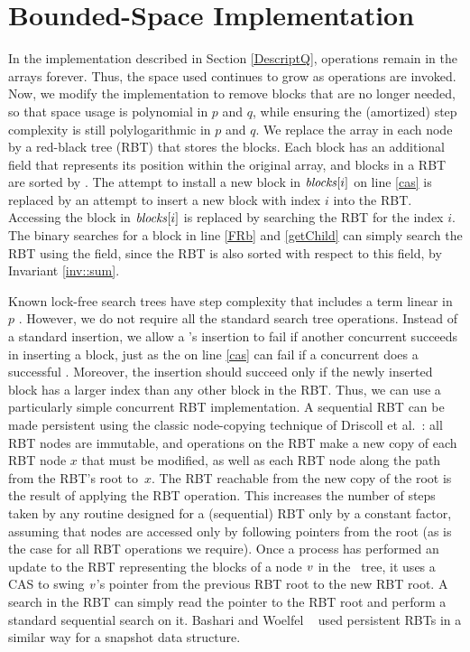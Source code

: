 
\section{Bounded-Space Implementation}
\label{reducing}

In the implementation described in Section \ref{DescriptQ}, 
operations remain in the  arrays forever. 
Thus, the space used continues to grow as operations are invoked.
Now, we modify the implementation to remove blocks that are no longer needed, so that space usage is
polynomial in $p$ and $q$, while ensuring the (amortized) step complexity is still polylogarithmic 
in $p$ and $q$. We replace the  array in each node by a red-black tree (RBT)
that stores the blocks.
Each block has an additional  field
that represents its position within the original  array, and
blocks in a RBT are sorted by .
The attempt to install a new block in $\mbox{\textit{blocks}}[i]$  on line \ref{cas}
is replaced by an attempt to insert a new block with index $i$ into the RBT.
Accessing the block in $\mbox{\textit{blocks}}[i]$ is 
replaced by searching the RBT for the  index $i$.
The binary searches for a block in line \ref{FRb} and \ref{getChild} can simply search the RBT
using the  field, since the RBT is also sorted with respect to this field, by Invariant \ref{inv::sum}.
 
Known lock-free search trees have step complexity that includes a term linear in $p$ \cite{EFHR14,Ko20}.  
However, we do not require all the standard search tree operations.
Instead of a standard insertion, we allow a 's insertion to fail if another
concurrent  succeeds in inserting a block, just as the  on line \ref{cas}
can fail if a concurrent  does a successful .
Moreover, the insertion should succeed only if the newly inserted block has a larger index than any other block in the RBT.
Thus, we can use a particularly simple concurrent RBT implementation.
A sequential RBT can be made persistent using the classic node-copying technique of 
Driscoll et al.~\cite{DSST89}:  all RBT nodes are immutable, and operations on the 
RBT make a new copy of each RBT node $x$ that must be modified, as well
as each RBT node along the path from the RBT's root to~$x$.
The RBT reachable from the new copy of the root is the result of applying the RBT operation.
This increases the number of steps taken by any routine designed for a (sequential) RBT only by a constant factor, assuming that nodes are accessed only by following pointers from the root (as is the case for all RBT operations we require).
Once a process has performed an update to the RBT representing the blocks of a node 
$\mbox{\textnormal{\textit{v}}}$ in the \ordering\ tree, 
it uses a CAS to swing $\mbox{\textnormal{\textit{v}}}$'s pointer from the previous RBT root to the new RBT root.
A search in the RBT can simply read the pointer to the RBT root and perform a standard
sequential search on it.
Bashari and Woelfel ~\cite{DBLP:conf/podc/BashariW21} used persistent RBTs in a similar way for a snapshot data structure.

